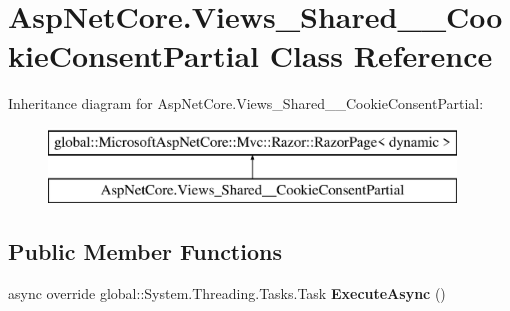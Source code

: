 \hypertarget{class_asp_net_core_1_1_views___shared_____cookie_consent_partial}{}\section{Asp\+Net\+Core.\+Views\+\_\+\+Shared\+\_\+\+\_\+\+Cookie\+Consent\+Partial Class Reference}
\label{class_asp_net_core_1_1_views___shared_____cookie_consent_partial}
Inheritance diagram for Asp\+Net\+Core.\+Views\+\_\+\+Shared\+\_\+\+\_\+\+Cookie\+Consent\+Partial\+:\begin{figure}[H]
\begin{center}
\leavevmode
\includegraphics[height=2.000000cm]{class_asp_net_core_1_1_views___shared_____cookie_consent_partial}
\end{center}
\end{figure}
\subsection*{Public Member Functions}
\begin{DoxyCompactItemize}
\item 
\mbox{\label{class_asp_net_core_1_1_views___shared_____cookie_consent_partial_a4f0f4a2fb8817375e2d9e2ef6a603624}} 
async override global\+::\+System.\+Threading.\+Tasks.\+Task {\bfseries Execute\+Async} ()
\end{DoxyCompactItemize}
